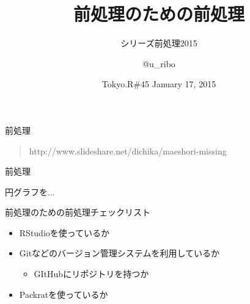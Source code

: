 \documentclass[17pt,ignorenonframetext,]{beamer}
\title{前処理のための前処理}
\subtitle{シリーズ前処理2015}
\author{@u\_ribo}
\date{Tokyo.R\#45 January 17, 2015}
\begin{document}
\frame{\titlepage}

\begin{frame}


\end{frame}

\begin{frame}{前処理 \faFood}


\begin{quote}
\scriptsize{http://www.slideshare.net/dichika/maeshori-missing}
\end{quote}

\end{frame}

\begin{frame}{前処理 \faFood}


\tiny{円グラフを...}

\end{frame}

\begin{frame}{前処理のための前処理チェックリスト}

\begin{itemize}
\itemsep1pt\parskip0pt
\item
  RStudioを使っているか
\item
  Gitなどのバージョン管理システムを利用しているか

  \begin{itemize}
  \itemsep1pt\parskip0pt
  \item
    GItHubにリポジトリを持つか
  \end{itemize}
\item
  Packratを使っているか
\end{itemize}

\end{frame}
\end{document}
